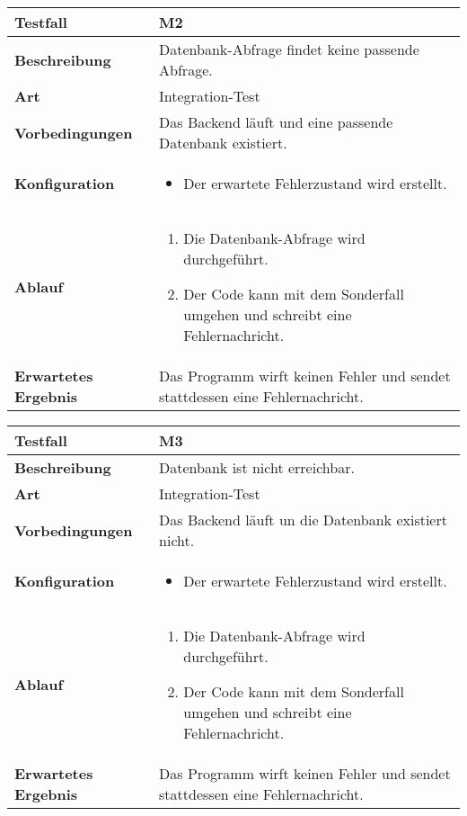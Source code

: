 \begin{longtable}{p{}|p{}}
	\hline
	\textbf{Testfall}               & \textbf{M2} \\
	\hline
	\textbf{Beschreibung}   		& Datenbank-Abfrage findet keine passende Abfrage. \\
	\hline
	\textbf{Art}    				& Integration-Test \\
	\hline
	\textbf{Vorbedingungen}    		& Das Backend läuft und eine passende Datenbank existiert. \\
	\hline
	\textbf{Konfiguration}   	 	& 
	\begin{itemize}
		\item Der erwartete Fehlerzustand wird erstellt.
	\end{itemize} \\
	\hline
	\textbf{Ablauf}    				& 
	\begin{enumerate}
		\item Die Datenbank-Abfrage wird durchgeführt.
		\item Der Code kann mit dem Sonderfall umgehen und schreibt eine Fehlernachricht.
	\end{enumerate} \\
	\hline
	\textbf{Erwartetes Ergebnis}    & Das Programm wirft keinen Fehler und sendet stattdessen eine Fehlernachricht. \\
	\hline
\end{longtable}\label{tab:testfall-M2}

\begin{longtable}{p{}|p{}}
	\hline
	\textbf{Testfall}               & \textbf{M3} \\
	\hline
	\textbf{Beschreibung}   		& Datenbank ist nicht erreichbar. \\
	\hline
	\textbf{Art}    				& Integration-Test \\
	\hline
	\textbf{Vorbedingungen}    		& Das Backend läuft un die Datenbank existiert nicht. \\
	\hline
	\textbf{Konfiguration}   	 	& 
	\begin{itemize}
		\item Der erwartete Fehlerzustand wird erstellt.
	\end{itemize} \\
	\hline
	\textbf{Ablauf}    				& 
	\begin{enumerate}
		\item Die Datenbank-Abfrage wird durchgeführt.
		\item Der Code kann mit dem Sonderfall umgehen und schreibt eine Fehlernachricht.
	\end{enumerate} \\
	\hline
	\textbf{Erwartetes Ergebnis}    & Das Programm wirft keinen Fehler und sendet stattdessen eine Fehlernachricht. \\
	\hline
\end{longtable}\label{tab:testfall-M3}

